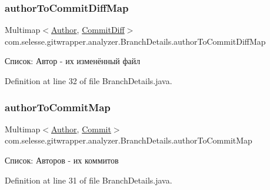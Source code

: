 \subsubsection{\texorpdfstring{author\+To\+Commit\+Diff\+Map}{authorToCommitDiffMap}}
{\footnotesize\ttfamily Multimap$<$\hyperlink{classcom_1_1selesse_1_1gitwrapper_1_1myobjects_1_1_author}{Author}, \hyperlink{classcom_1_1selesse_1_1gitwrapper_1_1myobjects_1_1_commit_diff}{Commit\+Diff}$>$ com.\+selesse.\+gitwrapper.\+analyzer.\+Branch\+Details.\+author\+To\+Commit\+Diff\+Map\hspace{0.3cm}{\ttfamily [private]}}



Список\+: Автор -\/ их изменённый файл 



Definition at line 32 of file Branch\+Details.\+java.

\mbox{\label{classcom_1_1selesse_1_1gitwrapper_1_1analyzer_1_1_branch_details_a7d1d082fec3eff2baa1f51b0682a5088}} 
\subsubsection{\texorpdfstring{author\+To\+Commit\+Map}{authorToCommitMap}}
{\footnotesize\ttfamily Multimap$<$\hyperlink{classcom_1_1selesse_1_1gitwrapper_1_1myobjects_1_1_author}{Author}, \hyperlink{classcom_1_1selesse_1_1gitwrapper_1_1myobjects_1_1_commit}{Commit}$>$ com.\+selesse.\+gitwrapper.\+analyzer.\+Branch\+Details.\+author\+To\+Commit\+Map\hspace{0.3cm}{\ttfamily [private]}}



Список\+: Авторов -\/ их коммитов 



Definition at line 31 of file Branch\+Details.\+java.

\mbox{\label{classcom_1_1selesse_1_1gitwrapper_1_1analyzer_1_1_branch_details_a37666451077ef09c1976aaaa20077ed5}} 
